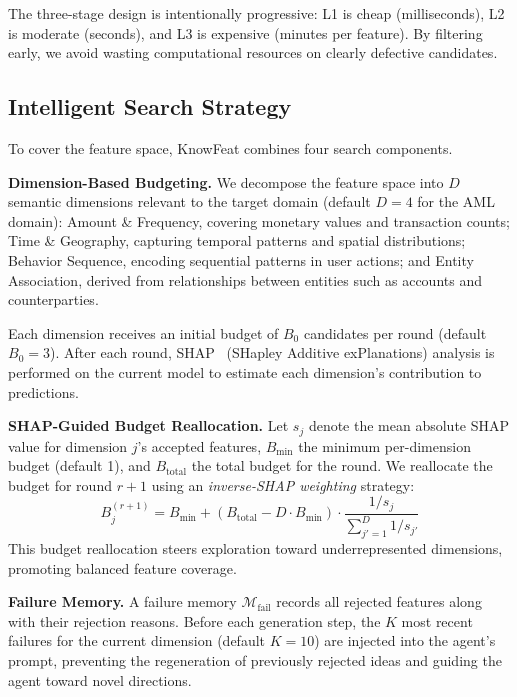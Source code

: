 The three-stage design is intentionally progressive: L1 is cheap (milliseconds), L2 is moderate (seconds), and L3 is expensive (minutes per feature). By filtering early, we avoid wasting computational resources on clearly defective candidates.

\subsection{Intelligent Search Strategy}
\label{subsec:search}

To cover the feature space, KnowFeat combines four search components.

\textbf{Dimension-Based Budgeting.}
We decompose the feature space into $D$ semantic dimensions relevant to the target domain (default $D=4$ for the AML domain): Amount \& Frequency, covering monetary values and transaction counts; Time \& Geography, capturing temporal patterns and spatial distributions; Behavior Sequence, encoding sequential patterns in user actions; and Entity Association, derived from relationships between entities such as accounts and counterparties.

Each dimension receives an initial budget of $B_0$ candidates per round (default $B_0 = 3$). After each round, SHAP~\cite{lundberg2017shap} (SHapley Additive exPlanations) analysis is performed on the current model to estimate each dimension's contribution to predictions.

\textbf{SHAP-Guided Budget Reallocation.}
Let $s_j$ denote the mean absolute SHAP value for dimension $j$'s accepted features, $B_{\min}$ the minimum per-dimension budget (default 1), and $B_{\text{total}}$ the total budget for the round. We reallocate the budget for round $r{+}1$ using an \emph{inverse-SHAP weighting} strategy:
\begin{equation}
    B_j^{(r+1)} = B_{\min} + (B_{\text{total}} - D \cdot B_{\min}) \cdot \frac{1/s_j}{\sum_{j'=1}^{D} 1/s_{j'}}
\end{equation}
This budget reallocation steers exploration toward underrepresented dimensions, promoting balanced feature coverage.

\textbf{Failure Memory.}
A failure memory $\mathcal{M}_{\text{fail}}$ records all rejected features along with their rejection reasons. Before each generation step, the $K$ most recent failures for the current dimension (default $K=10$) are injected into the agent's prompt, preventing the regeneration of previously rejected ideas and guiding the agent toward novel directions.

